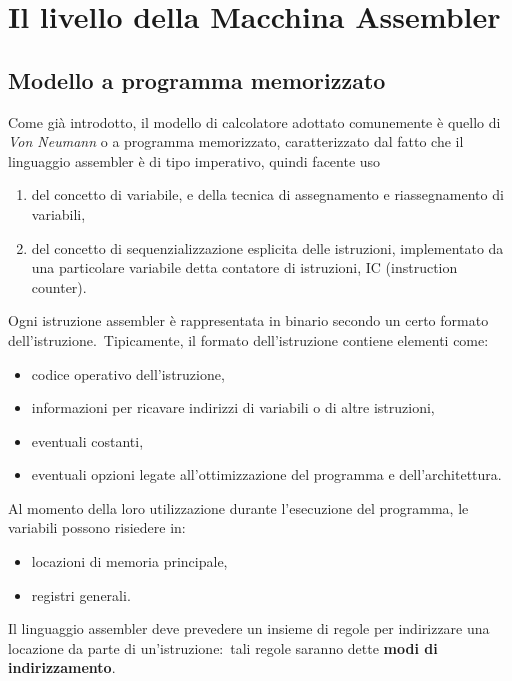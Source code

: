 \chapter{Il livello della Macchina Assembler}

\section{Modello a programma memorizzato}

Come già introdotto, il modello di calcolatore adottato comunemente è quello di \textit{Von Neumann} o a programma memorizzato, caratterizzato dal fatto che il linguaggio assembler è di tipo imperativo, quindi facente uso

\begin{enumerate}
    \item del concetto di variabile, e della tecnica di assegnamento e riassegnamento di variabili,
    \item del concetto di sequenzializzazione esplicita delle istruzioni, implementato da una particolare variabile detta contatore di istruzioni, IC (instruction counter).
\end{enumerate}

\noindent Ogni istruzione assembler è rappresentata in binario secondo un certo formato dell'istruzione.\
Tipicamente, il formato dell'istruzione contiene elementi come:

\begin{itemize}
    \item codice operativo dell'istruzione,
    \item informazioni per ricavare indirizzi di variabili o di altre istruzioni,
    \item eventuali costanti,
    \item eventuali opzioni legate all'ottimizzazione del programma e dell'architettura.
\end{itemize}

\noindent Al momento della loro utilizzazione durante l'esecuzione del programma, le variabili possono risiedere in:

\begin{itemize}
    \item  locazioni di memoria principale,
    \item  registri generali.
\end{itemize}

\noindent Il linguaggio assembler deve prevedere un insieme di regole per indirizzare una locazione da parte di un'istruzione:\ tali regole saranno dette \textbf{modi di indirizzamento}.

